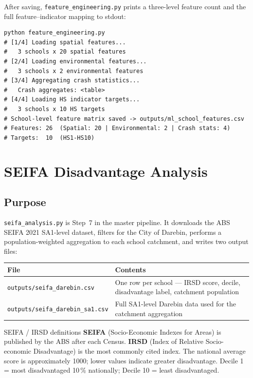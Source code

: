 \documentclass[11pt,a4paper,openany]{book}
\begin{document}
After saving, \texttt{feature\_engineering.py} prints a three-level feature count and the
full feature--indicator mapping to stdout:

\begin{lstlisting}[style=bash, caption={Running feature engineering.}]
python feature_engineering.py
# [1/4] Loading spatial features...
#   3 schools x 20 spatial features
# [2/4] Loading environmental features...
#   3 schools x 2 environmental features
# [3/4] Aggregating crash statistics...
#   Crash aggregates: <table>
# [4/4] Loading HS indicator targets...
#   3 schools x 10 HS targets
# School-level feature matrix saved -> outputs/ml_school_features.csv
# Features: 26  (Spatial: 20 | Environmental: 2 | Crash stats: 4)
# Targets:  10  (HS1-HS10)
\end{lstlisting}

\chapter{SEIFA Disadvantage Analysis}

\section{Purpose}

\texttt{seifa\_analysis.py} is Step~7 in the master pipeline.  It downloads the ABS
SEIFA 2021 SA1-level dataset, filters for the City of Darebin, performs a
population-weighted aggregation to each school catchment, and writes two output files:

\begin{center}
\begin{tabular}{lL{8cm}}
\toprule
File & Contents \\
\midrule
\texttt{outputs/seifa\_darebin.csv} & One row per school --- IRSD score, decile,
  disadvantage label, catchment population \\
\texttt{outputs/seifa\_darebin\_sa1.csv} & Full SA1-level Darebin data used for the
  catchment aggregation \\
\bottomrule
\end{tabular}
\end{center}

\begin{keybox}{SEIFA / IRSD definitions}
\textbf{SEIFA} (Socio-Economic Indexes for Areas) is published by the ABS after each
Census.  \textbf{IRSD} (Index of Relative Socio-economic Disadvantage) is the most
commonly cited index.  The national average score is approximately 1000; lower values
indicate greater disadvantage.  Decile 1 = most disadvantaged 10\,\% nationally;
Decile 10 = least disadvantaged.
\end{keybox}
\end{document}

